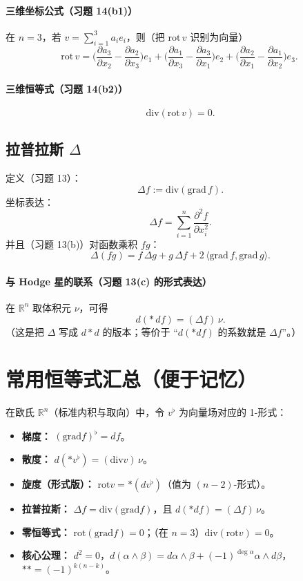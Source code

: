 \documentclass[11pt,a4paper]{article}
\newcommand{\R}{\mathbb{R}}
\newcommand{\vol}{\nu}
\newcommand{\ip}[2]{\langle #1,#2\rangle}
\begin{document}
\paragraph{三维坐标公式（习题 14(b1)）}
在 $n=3$，若 $v=\sum_{i=1}^3 a_i e_i$，则（把 $\mathrm{rot}\,v$ 识别为向量）
\[
\boxed{
\mathrm{rot}\,v=
\Big(\frac{\partial a_3}{\partial x_2}-\frac{\partial a_2}{\partial x_3}\Big)e_1+
\Big(\frac{\partial a_1}{\partial x_3}-\frac{\partial a_3}{\partial x_1}\Big)e_2+
\Big(\frac{\partial a_2}{\partial x_1}-\frac{\partial a_1}{\partial x_2}\Big)e_3.}
\]

\paragraph{三维恒等式（习题 14(b2)）}
\[
\boxed{\ \mathrm{div}(\mathrm{rot}\,v)=0. }
\]

\subsection{拉普拉斯 \texorpdfstring{$\Delta$}{Delta}}
定义（习题 13）：
\[
\boxed{\ \Delta f := \mathrm{div}(\mathrm{grad}\,f). }
\]
坐标表达：
\[
\boxed{\ \Delta f = \sum_{i=1}^n \frac{\partial^2 f}{\partial x_i^2}. }
\]
并且（习题 13(b)）对函数乘积 $fg$：
\[
\boxed{\ \Delta(fg)=f\,\Delta g + g\,\Delta f + 2\,\ip{\mathrm{grad}\,f}{\mathrm{grad}\,g}. }
\]

\paragraph{与 Hodge 星的联系（习题 13(c) 的形式表达）}
在 $\R^n$ 取体积元 $\vol$，可得
\[
\boxed{\ d(\ast\,df) = (\Delta f)\,\vol. }
\]
（这是把 $\Delta$ 写成 $d\ast d$ 的版本；等价于 ``$d(\ast df)$ 的系数就是 $\Delta f$''。）

\section{常用恒等式汇总（便于记忆）}
在欧氏 $\R^n$（标准内积与取向）中，令 $v^\flat$ 为向量场对应的 1-形式：
\begin{itemize}
  \item \textbf{梯度：} $(\mathrm{grad}f)^\flat = df$。
  \item \textbf{散度：} $d(\ast v^\flat)=(\mathrm{div}v)\,\vol$。
  \item \textbf{旋度（形式版）：} $\mathrm{rot}v=\ast(dv^\flat)$（值为 $(n-2)$-形式）。
  \item \textbf{拉普拉斯：} $\Delta f=\mathrm{div}(\mathrm{grad}f)$，且 $d(\ast df)=(\Delta f)\,\vol$。
  \item \textbf{零恒等式：} $\mathrm{rot}(\mathrm{grad}f)=0$；（在 $n=3$）$\mathrm{div}(\mathrm{rot}v)=0$。
  \item \textbf{核心公理：} $d^2=0$，$d(\alpha\wedge\beta)=d\alpha\wedge\beta+(-1)^{\deg\alpha}\alpha\wedge d\beta$，$\ast\ast=(-1)^{k(n-k)}$。
\end{itemize}
\end{document}
